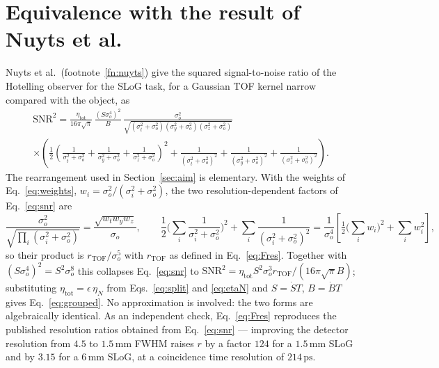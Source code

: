 \documentclass[11pt,a4paper]{article}
\newcommand{\rT}{r_{\mathrm{TOF}}}
\newcommand{\so}{\sigma_{\!o}}
\newcommand{\vt}{\sigma_t^{2}+\so^{2}}
\newcommand{\vy}{\sigma_y^{2}+\so^{2}}
\newcommand{\vz}{\sigma_z^{2}+\so^{2}}
\begin{document}

\clearpage

\appendix
\renewcommand{\theequation}{A.\arabic{equation}}\setcounter{equation}{0}
\renewcommand{\thefigure}{A.\arabic{figure}}\setcounter{figure}{0}

\section{Equivalence with the result of Nuyts et al.}
\label{sec:regroup}

Nuyts et al.\ (footnote~\ref{fn:nuyts}) give the squared signal-to-noise ratio of the
Hotelling observer for the SLoG task, for a Gaussian TOF kernel narrow compared with the
object, as
\begin{multline}
  \mathrm{SNR}^{2}=\frac{\eta_{\mathrm{tot}}}{16\pi\sqrt{\pi}}\,
  \frac{(S\so^{4})^{2}}{B}\,
  \frac{\so^{2}}{\sqrt{(\vt)(\vy)(\vz)}}\\[2pt]
  \times\left(\frac{1}{2}\left(\frac{1}{\vt}+\frac{1}{\vy}+\frac{1}{\vz}\right)^{\!2}
        +\frac{1}{(\vt)^{2}}+\frac{1}{(\vy)^{2}}+\frac{1}{(\vz)^{2}}\right).
  \label{eq:snr}
\end{multline}
The rearrangement used in Section~\ref{sec:aim} is elementary. With the weights of
Eq.~\eqref{eq:weights}, $w_i=\so^{2}/(\sigma_i^{2}+\so^{2})$, the two resolution-dependent
factors of Eq.~\eqref{eq:snr} are
\begin{equation}
  \frac{\so^{2}}{\sqrt{\textstyle\prod_i(\sigma_i^{2}+\so^{2})}}
     =\frac{\sqrt{w_t w_y w_z}}{\so},
  \qquad
  \frac{1}{2}\Big(\sum_i\frac{1}{\sigma_i^{2}+\so^{2}}\Big)^{\!2}
     +\sum_i\frac{1}{(\sigma_i^{2}+\so^{2})^{2}}
     =\frac{1}{\so^{4}}\left[\tfrac12\Big(\sum_i w_i\Big)^{\!2}+\sum_i w_i^{2}\right],
\end{equation}
so their product is $\rT/\so^{5}$ with $\rT$ as defined in Eq.~\eqref{eq:Fres}. Together
with $(S\so^{4})^{2}=S^{2}\so^{8}$ this collapses Eq.~\eqref{eq:snr} to
$\mathrm{SNR}^{2}=\eta_{\mathrm{tot}}S^{2}\so^{3}\rT/(16\pi\sqrt{\pi}B)$; substituting
$\eta_{\mathrm{tot}}=\epsilon\,\eta_N$ from Eqs.~\eqref{eq:split} and \eqref{eq:etaN} and
$S=\dot S T$, $B=\dot B T$ gives Eq.~\eqref{eq:grouped}. No approximation is involved: the
two forms are algebraically identical. As an independent check, Eq.~\eqref{eq:Fres}
reproduces the published resolution ratios obtained from Eq.~\eqref{eq:snr} --- improving
the detector resolution from $4.5$ to $1.5\,\mathrm{mm}$ FWHM raises $r$ by a factor $124$
for a $1.5\,\mathrm{mm}$ SLoG and by $3.15$ for a $6\,\mathrm{mm}$ SLoG, at a coincidence
time resolution of $214\,\mathrm{ps}$.
\end{document}
